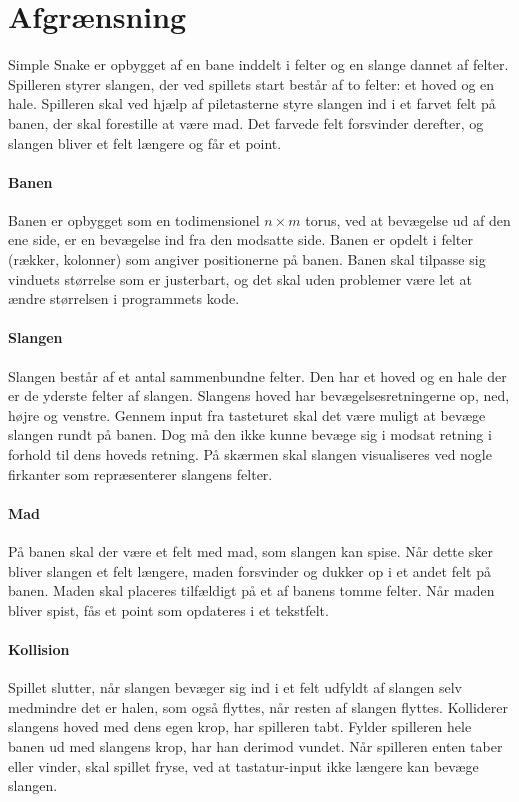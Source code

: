 \section{Afgrænsning}
Simple Snake er opbygget af en bane inddelt i felter og en slange dannet af felter. Spilleren styrer slangen, der ved spillets start består af to felter: et hoved og en hale. Spilleren skal ved hjælp af piletasterne styre slangen ind i et farvet felt på banen, der skal forestille at være mad. Det farvede felt forsvinder derefter, og slangen bliver et felt længere og får et point.

\paragraph{Banen}
Banen er opbygget som en todimensionel $n\times m$ torus, ved at bevægelse ud af den ene side, er en bevægelse ind fra den modsatte side. Banen er opdelt i felter (rækker, kolonner) som angiver positionerne på banen. Banen skal tilpasse sig vinduets størrelse som er justerbart, og det skal uden problemer være let at ændre størrelsen i programmets kode.

\paragraph{Slangen}
Slangen består af et antal sammenbundne felter. Den har et hoved og en hale der er de yderste felter af slangen. Slangens hoved har bevægelsesretningerne op, ned, højre og venstre. Gennem input fra tasteturet skal det være muligt at bevæge slangen rundt på banen. Dog må den ikke kunne bevæge sig i modsat retning i forhold til dens hoveds retning. På skærmen skal slangen visualiseres ved nogle firkanter som repræsenterer slangens felter.

\paragraph{Mad}
På banen skal der være et felt med mad, som slangen kan spise. Når dette sker bliver slangen et felt længere, maden forsvinder og dukker op i et andet felt på banen. Maden skal placeres tilfældigt på et af banens tomme felter. Når maden bliver spist, fås et point som opdateres i et tekstfelt.

\paragraph{Kollision}
Spillet slutter, når slangen bevæger sig ind i et felt udfyldt af slangen selv medmindre det er halen, som også flyttes, når resten af slangen flyttes. Kolliderer slangens hoved med dens egen krop, har spilleren tabt. Fylder spilleren hele banen ud med slangens krop, har han derimod vundet. Når spilleren enten taber eller vinder, skal spillet fryse, ved at tastatur-input ikke længere kan bevæge slangen.